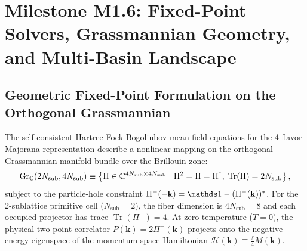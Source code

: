 \chapter{Milestone M1.6: Fixed-Point Solvers, Grassmannian Geometry, and Multi-Basin Landscape}
\label{ch:m1_6}

\section{Geometric Fixed-Point Formulation on the Orthogonal Grassmannian}
\label{sec:m1_6_grassmannian_geometry}

The self-consistent Hartree-Fock-Bogoliubov mean-field equations for the 4-flavor Majorana representation describe a nonlinear mapping on the orthogonal Grassmannian manifold bundle over the Brillouin zone:
\begin{equation}
\label{eq:m1_6_grassmannian_def}
\operatorname{Gr}_{\mathbb{C}}(2N_{\mathrm{sub}}, 4N_{\mathrm{sub}}) \equiv \left\{ \Pi \in \mathbb{C}^{4N_{\mathrm{sub}} \times 4N_{\mathrm{sub}}} \;\middle|\; \Pi^2 = \Pi = \Pi^\dagger, \; \operatorname{Tr}(\Pi) = 2N_{\mathrm{sub}} \right\},
\end{equation}
subject to the particle-hole constraint $\Pi^-(-\mathbf{k}) = \Id - (\Pi^-(\mathbf{k}))^*$. For the 2-sublattice primitive cell ($N_{\mathrm{sub}} = 2$), the fiber dimension is $4N_{\mathrm{sub}} = 8$ and each occupied projector has trace $\operatorname{Tr}(\Pi^-) = 4$.
At zero temperature ($T=0$), the physical two-point correlator $P(\mathbf{k}) = 2\Pi^-(\mathbf{k})$ projects onto the negative-energy eigenspace of the momentum-space Hamiltonian $\mathcal{H}(\mathbf{k}) \equiv \frac{\ii}{4} M(\mathbf{k})$.

